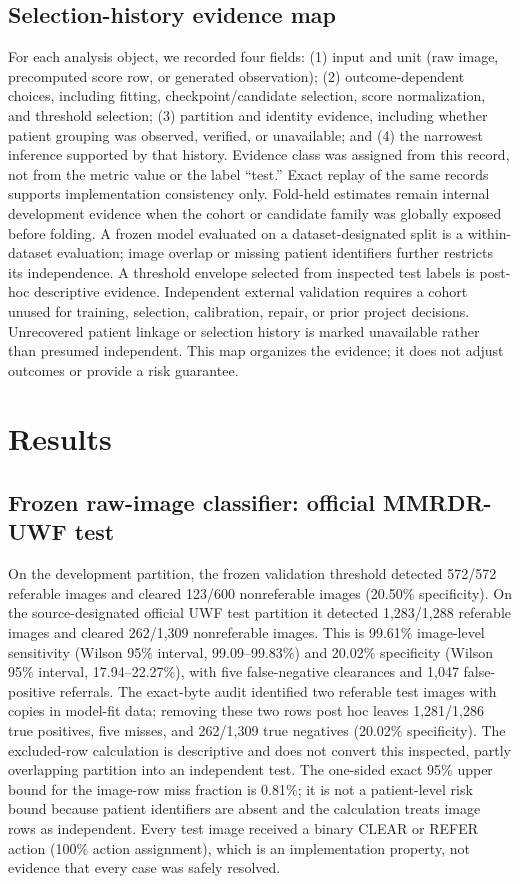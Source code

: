 \documentclass[11pt]{article}
\begin{document}
\subsection{Selection-history evidence map}
For each analysis object, we recorded four fields: (1) input and unit (raw image, precomputed score row, or generated observation); (2) outcome-dependent choices, including fitting, checkpoint/candidate selection, score normalization, and threshold selection; (3) partition and identity evidence, including whether patient grouping was observed, verified, or unavailable; and (4) the narrowest inference supported by that history. Evidence class was assigned from this record, not from the metric value or the label ``test.'' Exact replay of the same records supports implementation consistency only. Fold-held estimates remain internal development evidence when the cohort or candidate family was globally exposed before folding. A frozen model evaluated on a dataset-designated split is a within-dataset evaluation; image overlap or missing patient identifiers further restricts its independence. A threshold envelope selected from inspected test labels is post-hoc descriptive evidence. Independent external validation requires a cohort unused for training, selection, calibration, repair, or prior project decisions. Unrecovered patient linkage or selection history is marked unavailable rather than presumed independent. This map organizes the evidence; it does not adjust outcomes or provide a risk guarantee.

\section{Results}
\subsection{Frozen raw-image classifier: official MMRDR-UWF test}
On the development partition, the frozen validation threshold detected 572/572 referable images and cleared 123/600 nonreferable images (20.50\% specificity). On the source-designated official UWF test partition it detected 1,283/1,288 referable images and cleared 262/1,309 nonreferable images. This is 99.61\% image-level sensitivity (Wilson 95\% interval, 99.09--99.83\%) and 20.02\% specificity (Wilson 95\% interval, 17.94--22.27\%), with five false-negative clearances and 1,047 false-positive referrals. The exact-byte audit identified two referable test images with copies in model-fit data; removing these two rows post hoc leaves 1,281/1,286 true positives, five misses, and 262/1,309 true negatives (20.02\% specificity). The excluded-row calculation is descriptive and does not convert this inspected, partly overlapping partition into an independent test. The one-sided exact 95\% upper bound for the image-row miss fraction is 0.81\%; it is not a patient-level risk bound because patient identifiers are absent and the calculation treats image rows as independent. Every test image received a binary CLEAR or REFER action (100\% action assignment), which is an implementation property, not evidence that every case was safely resolved.
\end{document}
